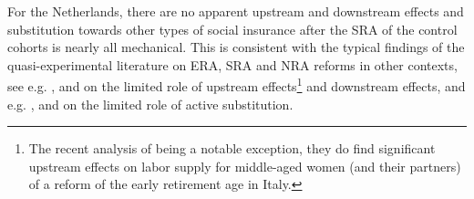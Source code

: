 \documentclass[12pt,a4paper]{article}
\begin{document}
For the Netherlands, there are no apparent upstream and downstream effects and substitution towards other types of social insurance after the SRA of the control cohorts is nearly all mechanical. This is consistent with the typical findings of the quasi-experimental literature on ERA, SRA and NRA reforms in other contexts, see e.g. \cite{mastrobuoni_labor_2009}, \cite{staubli_does_2013} and \cite{geyer_closing_2021} on the limited role of upstream effects\footnote{The recent analysis of \cite{carta_working_2019} being a notable exception, they do find significant upstream effects on labor supply for middle-aged women (and their partners) of a reform of the early retirement age in Italy.} and downstream effects, and e.g. \cite{manoli_effects_2018}, \cite{oguzoglu_et_al_2020} and \cite{geyer_closing_2021} on the limited role of active substitution.
\end{document}
